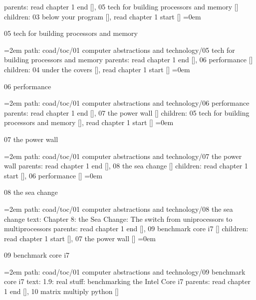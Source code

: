 \smallskip
parents:  read chapter 1 end [], 05 tech for building processors and memory []
\smallskip
children: 03 below your program [], read chapter 1 start []
\smallskip
\leftskip=0em
\par\endgroup
\bigskip
{}
05 tech for building processors and memory
\smallskip
\par\begingroup
\leftskip=2em
path: coad/toc/01 computer abstractions and technology/05 tech for building processors and memory
\smallskip
parents:  read chapter 1 end [], 06 performance []
\smallskip
children: 04 under the covers [], read chapter 1 start []
\smallskip
\leftskip=0em
\par\endgroup
\bigskip
{}
06 performance
\smallskip
\par\begingroup
\leftskip=2em
path: coad/toc/01 computer abstractions and technology/06 performance
\smallskip
parents:  read chapter 1 end [], 07 the power wall []
\smallskip
children: 05 tech for building processors and memory [], read chapter 1 start []
\smallskip
\leftskip=0em
\par\endgroup
\bigskip
{}
07 the power wall
\smallskip
\par\begingroup
\leftskip=2em
path: coad/toc/01 computer abstractions and technology/07 the power wall
\smallskip
parents:  read chapter 1 end [], 08 the sea change []
\smallskip
children: read chapter 1 start [], 06 performance []
\smallskip
\leftskip=0em
\par\endgroup
\bigskip
{}
08 the sea change
\smallskip
\par\begingroup
\leftskip=2em
path: coad/toc/01 computer abstractions and technology/08 the sea change
\smallskip
text:  Chapter 8: the Sea Change: The switch from uniprocessors to multiprocessors
\smallskip
parents:  read chapter 1 end [], 09 benchmark core i7 []
\smallskip
children: read chapter 1 start [], 07 the power wall []
\smallskip
\leftskip=0em
\par\endgroup
\bigskip
{}
09 benchmark core i7
\smallskip
\par\begingroup
\leftskip=2em
path: coad/toc/01 computer abstractions and technology/09 benchmark core i7
\smallskip
text:  1.9: real stuff: benchmarking the Intel Core i7
\smallskip
parents:  read chapter 1 end [], 10 matrix multiply python []
